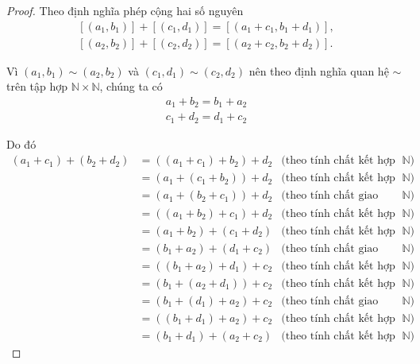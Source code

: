 \begin{proof}
    Theo định nghĩa phép cộng hai số nguyên
    \[
        \begin{split}
            [(a_{1}, b_{1})] + [(c_{1}, d_{1})] = [(a_{1}+c_{1}, b_{1}+d_{1})], \\
            [(a_{2}, b_{2})] + [(c_{2}, d_{2})] = [(a_{2}+c_{2}, b_{2}+d_{2})].
        \end{split}
    \]

    Vì $(a_{1}, b_{1}) \sim (a_{2}, b_{2})$ và $(c_{1}, d_{1})\sim (c_{2}, d_{2})$ nên theo định nghĩa quan hệ $\sim$ trên tập hợp $\mathbb{N}\times\mathbb{N}$, chúng ta có
    \[
        \begin{split}
            a_{1} + b_{2} = b_{1} + a_{2} \\
            c_{1} + d_{2} = d_{1} + c_{2}
        \end{split}
    \]

    Do đó
    \begin{align*}
        (a_{1} + c_{1}) + (b_{2} + d_{2}) & = ((a_{1} + c_{1}) + b_{2}) + d_{2} & \text{(theo tính chất kết hợp của phép cộng trên $\mathbb{N}$)}   \\
                                          & = (a_{1} + (c_{1} + b_{2})) + d_{2} & \text{(theo tính chất kết hợp của phép cộng trên $\mathbb{N}$)}   \\
                                          & = (a_{1} + (b_{2} + c_{1})) + d_{2} & \text{(theo tính chất giao hoán của phép cộng trên $\mathbb{N}$)} \\
                                          & = ((a_{1} + b_{2}) + c_{1}) + d_{2} & \text{(theo tính chất kết hợp của phép cộng trên $\mathbb{N}$)}   \\
                                          & = (a_{1} + b_{2}) + (c_{1} + d_{2}) & \text{(theo tính chất kết hợp của phép cộng trên $\mathbb{N}$)}   \\
                                          & = (b_{1} + a_{2}) + (d_{1} + c_{2}) & \text{(theo tính chất giao hoán của phép cộng trên $\mathbb{N}$)} \\
                                          & = ((b_{1} + a_{2}) + d_{1}) + c_{2} & \text{(theo tính chất kết hợp của phép cộng trên $\mathbb{N}$)}   \\
                                          & = (b_{1} + (a_{2} + d_{1})) + c_{2} & \text{(theo tính chất kết hợp của phép cộng trên $\mathbb{N}$)}   \\
                                          & = (b_{1} + (d_{1}) + a_{2}) + c_{2} & \text{(theo tính chất giao hoán của phép cộng trên $\mathbb{N}$)} \\
                                          & = ((b_{1} + d_{1}) + a_{2}) + c_{2} & \text{(theo tính chất kết hợp của phép cộng trên $\mathbb{N}$)}   \\
                                          & = (b_{1} + d_{1}) + (a_{2} + c_{2}) & \text{(theo tính chất kết hợp của phép cộng trên $\mathbb{N}$)}
    \end{align*}


\end{proof}
